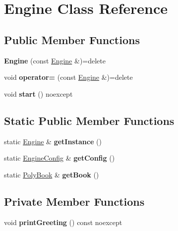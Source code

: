 \hypertarget{classEngine}{}\section{Engine Class Reference}
\label{classEngine}
\subsection*{Public Member Functions}
\begin{DoxyCompactItemize}
\item 
\mbox{\label{classEngine_ab9ee0ddff1237cf61eb482bfce9ab480}} 
{\bfseries Engine} (const \mbox{\hyperlink{classEngine}{Engine}} \&)=delete
\item 
\mbox{\label{classEngine_a5d7e8ec8383567cfe24b2b94c5730729}} 
void {\bfseries operator=} (const \mbox{\hyperlink{classEngine}{Engine}} \&)=delete
\item 
\mbox{\label{classEngine_aa78d58b978bb3c6bb147bc999e9523c1}} 
void {\bfseries start} () noexcept
\end{DoxyCompactItemize}
\subsection*{Static Public Member Functions}
\begin{DoxyCompactItemize}
\item 
\mbox{\label{classEngine_ae174f8fa16fbab1633489283db2b0c9f}} 
static \mbox{\hyperlink{classEngine}{Engine}} \& {\bfseries get\+Instance} ()
\item 
\mbox{\label{classEngine_a0829ed04a1463100784500122bbe426f}} 
static \mbox{\hyperlink{structEngineConfig}{Engine\+Config}} \& {\bfseries get\+Config} ()
\item 
\mbox{\label{classEngine_a02d2a190f06bd06f23eb6ed02474f990}} 
static \mbox{\hyperlink{classPolyBook}{Poly\+Book}} \& {\bfseries get\+Book} ()
\end{DoxyCompactItemize}
\subsection*{Private Member Functions}
\begin{DoxyCompactItemize}
\item 
\mbox{\label{classEngine_a8402fb1995ca48ebb645b82bf943aac7}} 
void {\bfseries print\+Greeting} () const noexcept
\end{DoxyCompactItemize}
